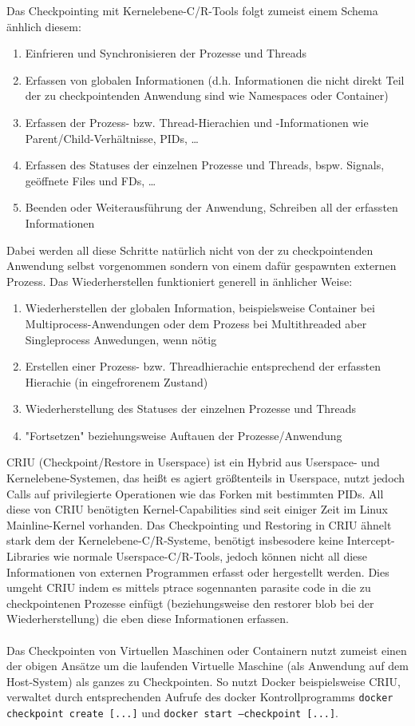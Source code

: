 \documentclass[a4paper]{article}
\begin{document}
Das Checkpointing mit Kernelebene-C/R-Tools folgt zumeist einem Schema änhlich diesem:
\begin{enumerate}
    \item Einfrieren und Synchronisieren der Prozesse und Threads
    \item Erfassen von globalen Informationen (d.h. Informationen die nicht direkt Teil der zu checkpointenden Anwendung sind wie Namespaces oder Container)
    \item Erfassen der Prozess- bzw. Thread-Hierachien und -Informationen wie Parent/Child-Verhältnisse, PIDs, \dots
    \item Erfassen des Statuses der einzelnen Prozesse und Threads, bspw. Signals, geöffnete Files und FDs, \dots
    \item Beenden oder Weiterausführung der Anwendung, Schreiben all der erfassten Informationen
\end{enumerate}
Dabei werden all diese Schritte natürlich nicht von der zu checkpointenden Anwendung selbst vorgenommen sondern von einem dafür gespawnten externen Prozess. Das Wiederherstellen funktioniert generell in änhlicher Weise:
\begin{enumerate}
    \item Wiederherstellen der globalen Information, beispielsweise Container bei Multiprocess-Anwendungen oder dem Prozess bei Multithreaded aber Singleprocess Anwedungen, wenn nötig
    \item Erstellen einer Prozess- bzw. Threadhierachie entsprechend der erfassten Hierachie (in eingefrorenem Zustand)
    \item Wiederherstellung des Statuses der einzelnen Prozesse und Threads
    \item "Fortsetzen" beziehungsweise Auftauen der Prozesse/Anwendung
\end{enumerate}
CRIU (Checkpoint/Restore in Userspace) ist ein Hybrid aus Userspace- und Kernelebene-Systemen, das heißt es agiert größtenteils in Userspace, nutzt jedoch Calls auf privilegierte Operationen wie das Forken mit bestimmten PIDs. All diese von CRIU benötigten Kernel-Capabilities sind seit einiger Zeit im Linux Mainline-Kernel vorhanden.
Das Checkpointing und Restoring in CRIU ähnelt stark dem der Kernelebene-C/R-Systeme, benötigt insbesodere keine Intercept-Libraries wie normale Userspace-C/R-Tools, jedoch können nicht all diese Informationen von externen Programmen erfasst oder hergestellt werden. Dies umgeht CRIU indem es mittels ptrace sogennanten parasite code in die zu checkpointenen Prozesse einfügt (beziehungsweise den restorer blob bei der Wiederherstellung) die eben diese Informationen erfassen.\\ \\
Das Checkpointen von Virtuellen Maschinen oder Containern nutzt zumeist einen der obigen Ansätze um die laufenden Virtuelle Maschine (als Anwendung auf dem Host-System) als ganzes zu Checkpointen. So nutzt Docker beispielsweise CRIU, verwaltet durch entsprechenden Aufrufe des docker Kontrollprogramms \texttt{docker checkpoint create [...]} und \texttt{docker start --checkpoint [...]}.
\end{document}
